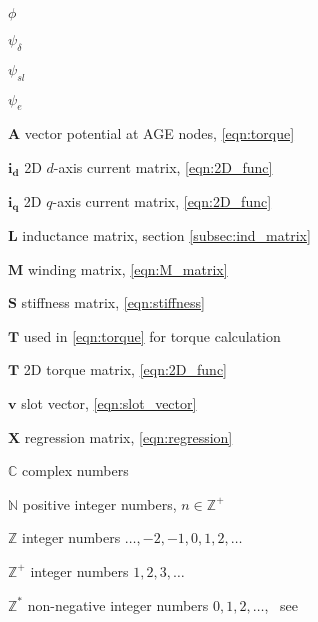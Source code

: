 \begin{Nomencl}
	 \item[$\phi$]           
	 \item[$\psi_{\delta}$]  
	 \item[$\psi_{sl}$]      
	 \item[$\psi_e$]         
	                         

   \item[$\mathbf{A}$]     vector potential at AGE nodes, \eqref{eqn:torque}
   \item[$\mathbf{i_d}$]   2D $d$-axis current matrix, \eqref{eqn:2D_func}
   \item[$\mathbf{i_q}$]   2D $q$-axis current matrix, \eqref{eqn:2D_func}
   \item[$\mathbf{L}$]     inductance matrix, section \ref{subsec:ind_matrix}
   \item[$\mathbf{M}$]     winding matrix, \eqref{eqn:M_matrix}
   \item[$\mathbf{S}$]     stiffness matrix, \eqref{eqn:stiffness}
   \item[$\mathbf{T}$]     used in \eqref{eqn:torque} for torque calculation
   \item[$\mathbf{T}$]     2D torque matrix, \eqref{eqn:2D_func}
   \item[$\mathbf{v}$]     slot vector, \eqref{eqn:slot_vector}
   \item[$\mathbf{X}$]     regression matrix, \eqref{eqn:regression}
        	 
   
   \item[$\mathbb{C}$]     complex numbers
   \item[$\mathbb{N}$]     positive integer numbers, $n \in \mathbb{Z}^{+}$
   \item[$\mathbb{Z}$]     integer numbers $\ldots,-2,-1,0,1,2,\ldots$
   \item[$\mathbb{Z}^{+}$] integer numbers $1,2,3,\ldots$
   \item[$\mathbb{Z}^{*}$] non-negative integer numbers $0,1,2,\ldots$,~%
                           see \cite{Weisstein2008} 
   
\end{Nomencl}



\endinput
